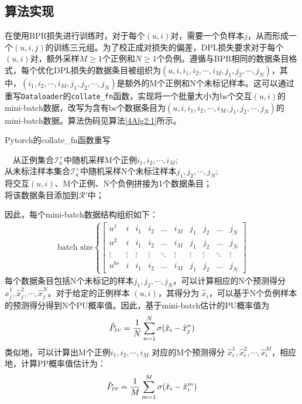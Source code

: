 \subsection{算法实现}
在使用BPR损失进行训练时，对于每个$(u,i)$对，需要一个负样本$j$，从而形成一个$(u,i,j)$的训练三元组。为了校正成对损失的偏差，DPL损失要求对于每个$(u,i)$对，额外采样$M\geq 1$个正例和$N\geq1$个负例。遵循与BPR相同的数据条目格式，每个优化DPL损失的数据条目被组织为$(u,i,i_1,i_2,\cdots,i_M,j_1,j_2,\cdots,j_N)$，其中，$(i_1,i_2,\cdots,i_M,j_1,j_2,\cdots,j_N)$是额外的M个正例和N个未标记样本。这可以通过重写\verb|Dataloader|的\verb|collate_fn|函数，实现将一个批量大小为bs个交互$(u,i)$的mini-batch数据，改写为含有bs个数据条目为$(u,i,i_1,i_2,\cdots,i_M,j_1,j_2,\cdots,j_N)$的mini-batch数据。算法伪码见算法\ref{4Alg2:1}所示。
\begin{algorithm}[!]
	\SetAlgoLined
	\small
	\caption{Pytorch的collate\_fn函数重写}\label{4Alg2:1}
	{
		~~从正例集合$\mathcal{I}_u^+$中随机采样M个正例$i_1,i_2,\cdots,i_M$;\\
		从未标注样本集合$\mathcal{I}_u^+$中随机采样N个未标注样本$j_1,j_2,\cdots,j_N$;\\
		将交互$(u,i)$、M个正例、N个负例拼接为1个数据条目；\\
		将该数据条目添加到$\mathcal{R}\prime$中；
	}
\end{algorithm}

因此，每个mini-batch数据结构组织如下：
\begin{eqnarray}\label{eq:mini}
	\text{batch size}\left\{ \left[\begin{array}{cccccccccc}
		u^{1} & {i}   &i_{1} & i_{2} & \ldots &i_{M} &   j_{1}& j_{2} & \ldots &j_{N} \\
		u^{2} & i & i_{1}& i_{2} & \ldots &i_{M} &  j_{1}& j_{2} & \ldots &j_{N} \\
		\vdots & \vdots & \vdots & \vdots &\ddots & \vdots & \vdots & \vdots & \ddots & \vdots \\
		u^{bs} & i & i_{1}& i_{2} & \ldots &i_{M} &  j_{1}& j_{2} & \ldots &j_{N} 
	\end{array}\right]\right.
\end{eqnarray}
每个数据条目包括N个未标记的样本$j_1,j_2,\cdots,j_N$，可以计算相应的N个预测得分 $\hat{x}_{j}^1,\hat{x}_{j}^2,\cdots,\hat{x}_{j}^N$。对于给定的正例样本 $(u,i)$，其得分为 $\hat{x}_i$，可以基于N个负例样本的预测得分得到N个PU概率值。因此，基于mini-batch估计的PU概率值为
\[\hat{P}_\textsc{pu} = \frac{1}{N} \sum_{n=1}^{N}\sigma (\hat{x}_i - \hat{x}_{j}^n)\]
类似地，可以计算出M个正例$i_1,i_2,\cdots,i_M$ 对应的M个预测得分 $\hat{x}_{i}^1,\hat{x}_{i}^2,\cdots,\hat{x}_{i}^M$，相应地，计算PP概率值估计为：
\[\hat{P}_\textsc{pp} = \frac{1}{M} \sum_{m=1}^{M}\sigma (\hat{x}_i - \hat{x}_{i}^m)\]

